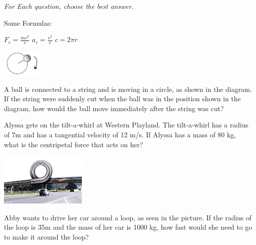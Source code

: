 \documentclass[10pt]{examdesign}
\begin{document}
\begin{multiplechoice} [title={Multiple Choice},
	rearrange=no]

\textit{For Each question, choose the best answer.}

	Some Formulas: 
	\begin{center}
	$F_c = \frac{mv^2}{r} $	\hspace{1 in} $a_c = \frac{v^2}{r}$ \hspace{1in} $c = 2 \pi r $
	\vspace{0.1in}
\end{center}	
	


\begin{question}
	\begin{center}
		\includegraphics[height=0.5in]{circleball.png}
	\end{center}A ball is connected to a string and is moving in a circle, as shown in the diagram.  If the string were suddenly cut when the ball was in the position shown in the diagram, how would the ball move immediately after the string was cut?

\end{question}

\begin{question}
	Alyssa gets on the tilt-a-whirl at Western Playland.  The tilt-a-whirl has a radius of 7m and has a tangential velocity of 12 m/s.  If Alyssa has a mass of 80 kg, what is the centripetal force that acts on her?  

\end{question}

\begin{question}
	\begin{center}
		\includegraphics[height=1in]{hotwheels.png}
	\end{center}
Abby wants to drive her car around a loop, as seen in the picture.  If the radius of the loop is 35m and the mass of her car is 1000 kg, how fast would she need to go to make it around the loop?





\end{question}
\end{multiplechoice}
\end{document}
